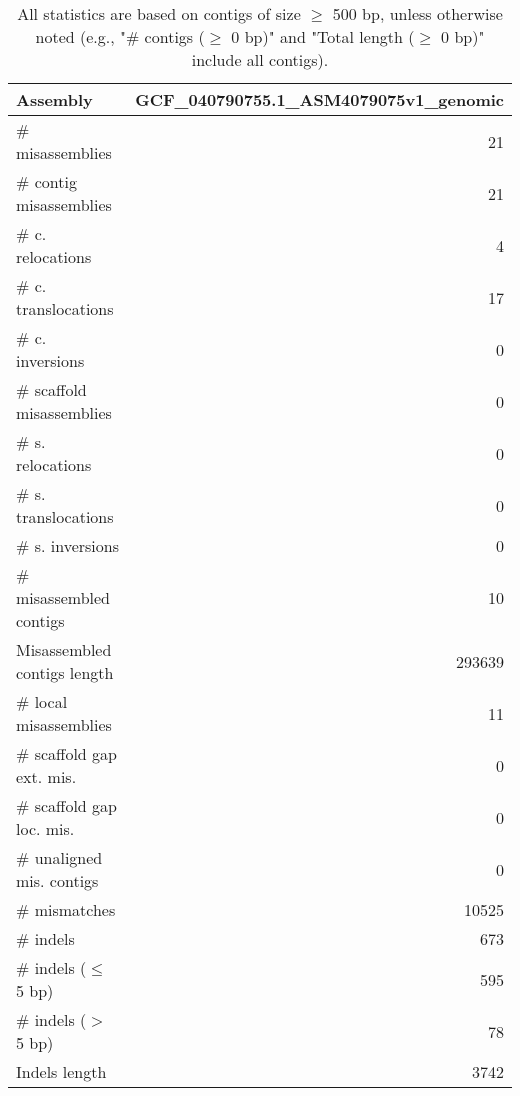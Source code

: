 \documentclass[12pt,a4paper]{article}
\begin{document}
\begin{table}[ht]
\begin{center}
\caption{All statistics are based on contigs of size $\geq$ 500 bp, unless otherwise noted (e.g., "\# contigs ($\geq$ 0 bp)" and "Total length ($\geq$ 0 bp)" include all contigs).}
\begin{tabular}{|l*{1}{|r}|}
\hline
Assembly & GCF\_040790755.1\_ASM4079075v1\_genomic \\ \hline
\# misassemblies & 21 \\ \hline
\hspace{2mm}\# contig misassemblies & 21 \\ \hline
\hspace{5mm}\# c. relocations & 4 \\ \hline
\hspace{5mm}\# c. translocations & 17 \\ \hline
\hspace{5mm}\# c. inversions & 0 \\ \hline
\hspace{2mm}\# scaffold misassemblies & 0 \\ \hline
\hspace{5mm}\# s. relocations & 0 \\ \hline
\hspace{5mm}\# s. translocations & 0 \\ \hline
\hspace{5mm}\# s. inversions & 0 \\ \hline
\# misassembled contigs & 10 \\ \hline
Misassembled contigs length & 293639 \\ \hline
\# local misassemblies & 11 \\ \hline
\# scaffold gap ext. mis. & 0 \\ \hline
\# scaffold gap loc. mis. & 0 \\ \hline
\# unaligned mis. contigs & 0 \\ \hline
\# mismatches & 10525 \\ \hline
\# indels & 673 \\ \hline
\hspace{5mm}\# indels ($\leq$ 5 bp) & 595 \\ \hline
\hspace{5mm}\# indels ($>$ 5 bp) & 78 \\ \hline
Indels length & 3742 \\ \hline
\end{tabular}
\end{center}
\end{table}
\end{document}
